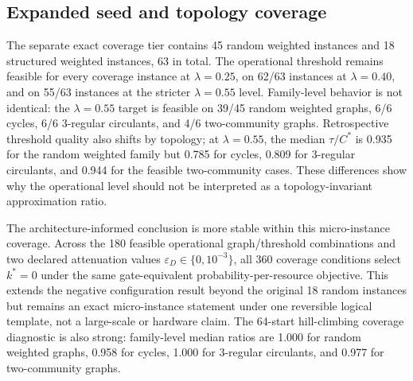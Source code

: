 \documentclass[5p,times]{elsarticle}
\begin{document}
\begin{table}[t]
\centering
\caption{Median target-hit probability for operational thresholds on the 18 primary instances, restricted to thresholds found feasible by exact Tier-I validation. The AA reference uses exact $\rho_\tau$ only for validation-stage stopping-depth selection; method-specific resource units remain unmatched.}
\label{tab:opermetric}

\end{table}

\subsection{Expanded seed and topology coverage}
The separate exact coverage tier contains 45 random weighted instances and 18 structured weighted instances, 63 in total. The operational threshold remains feasible for every coverage instance at $\lambda=0.25$, on 62/63 instances at $\lambda=0.40$, and on 55/63 instances at the stricter $\lambda=0.55$ level. Family-level behavior is not identical: the $\lambda=0.55$ target is feasible on 39/45 random weighted graphs, 6/6 cycles, 6/6 3-regular circulants, and 4/6 two-community graphs. Retrospective threshold quality also shifts by topology; at $\lambda=0.55$, the median $\tau/C^*$ is 0.935 for the random weighted family but 0.785 for cycles, 0.809 for 3-regular circulants, and 0.944 for the feasible two-community cases. These differences show why the operational level should not be interpreted as a topology-invariant approximation ratio.

The architecture-informed conclusion is more stable within this micro-instance coverage. Across the 180 feasible operational graph/threshold combinations and two declared attenuation values $\varepsilon_D\in\{0,10^{-3}\}$, all 360 coverage conditions select $k^*=0$ under the same gate-equivalent probability-per-resource objective. This extends the negative configuration result beyond the original 18 random instances but remains an exact micro-instance statement under one reversible logical template, not a large-scale or hardware claim. The 64-start hill-climbing coverage diagnostic is also strong: family-level median ratios are 1.000 for random weighted graphs, 0.958 for cycles, 1.000 for 3-regular circulants, and 0.977 for two-community graphs.

\begin{table}[t]
\centering
\caption{Expanded exact seed/topology coverage. Feasibility and $\tau/C^*$ are retrospective exact-validation quantities; HC denotes the 64-start hill-climbing coverage diagnostic. The QAOA inferential suite remains restricted to the 18 primary rows and is not enlarged by the additional coverage rows.}
\label{tab:coverage}

\end{table}
\end{document}
